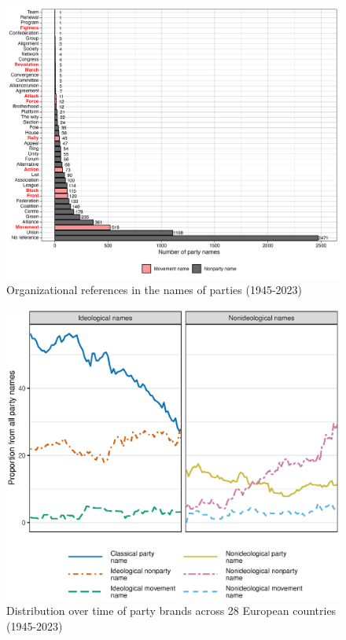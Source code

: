 \documentclass[12pt]{article}
\begin{document}
\begin{figure}[H]
\includegraphics[width=\textwidth]{./Figures/org_types.png}
\caption{Organizational references in the names of parties (1945-2023)}
\end{figure}

\clearpage

\begin{figure}[H]
\caption{Distribution over time of party brands across 28 European countries (1945-2023)}
\label{Fig:timeline}
\includegraphics[width=\textwidth]{./Figures/all_types.eps}
\end{figure}
\end{document}
